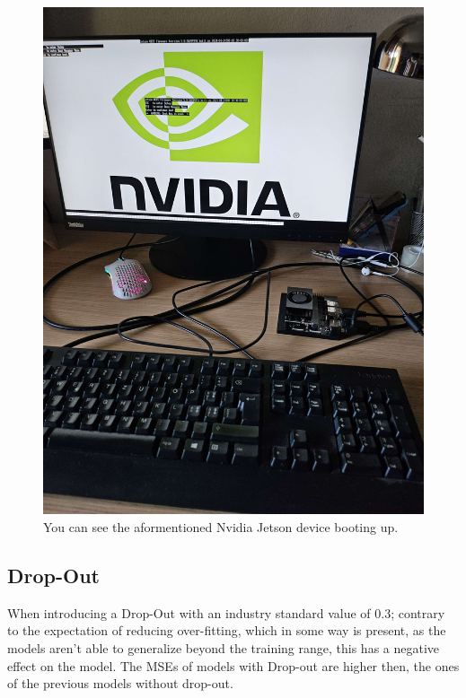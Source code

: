 \documentclass{article}
\begin{document}
\begin{figure}[ht]
    \centering
    \includegraphics[width=0.5\paperwidth]{images/JetsonBoot.jpg}
    \caption{You can see the aformentioned Nvidia Jetson device booting up.}
    \label{fig:JetsonBoot}
\end{figure}

\newpage
\tableofcontents
\newpage




\subsection{Drop-Out}
When introducing a Drop-Out with an industry standard value of 0.3; contrary 
to the expectation of reducing over-fitting, which in some way is present, 
as the models aren't able to generalize beyond the training range, this has 
a negative effect on the model. The MSEs of models with Drop-out are higher 
then, the ones of the previous models without drop-out.
\end{document}
